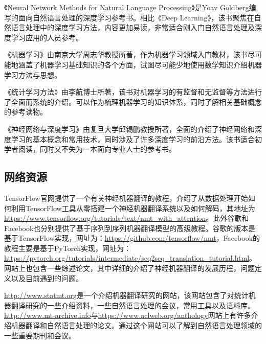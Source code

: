 \parinterval 《Neural Network Methods for Natural Language Processing》\cite{goldberg2017neural}是Yoav Goldberg编写的面向自然语言处理的深度学习参考书。相比《Deep Learning》，该书聚焦在自然语言处理中的深度学习方法，内容更加易读，非常适合刚入门自然语言处理及深度学习应用的人员参考。

\parinterval 《机器学习》\cite{周志华2016机器学习}由南京大学周志华教授所著，作为机器学习领域入门教材，该书尽可能地涵盖了机器学习基础知识的各个方面，试图尽可能少地使用数学知识介绍机器学习方法与思想。

\parinterval 《统计学习方法》\cite{李航2012统计学习方法}由李航博士所著，该书对机器学习的有监督和无监督等方法进行了全面而系统的介绍。可以作为梳理机器学习的知识体系，同时了解相关基础概念的参考读物。

\parinterval 《神经网络与深度学习》\cite{邱锡鹏2020神经网络与深度学习}由复旦大学邱锡鹏教授所著，全面的介绍了神经网络和深度学习的基本概念和常用技术，同时涉及了许多深度学习的前沿方法。该书适合初学者阅读，同时又不失为一本面向专业人士的参考书。

\subsection{网络资源}

\parinterval  TensorFlow官网提供了一个有关神经机器翻译的教程，介绍了从数据处理开始如何利用TensorFlow工具从零搭建一个神经机器翻译系统以及如何解码，其地址为\url{https://www.tensorflow.org/tutorials/text/nmt\_with\_attention}。此外谷歌和Facebook也分别提供了基于序列到序列机器翻译模型的高级教程。谷歌的版本是基于TensorFlow实现，网址为：\url{https://github.com/tensorflow/nmt}，Facebook的教程主要是基于PyTorch实现，网址为：\url{https://pytorch.org/tutorials/intermediate/seq2seq\_translation\_tutorial.html}。网站上也包含一些综述论文，其中详细的介绍了神经机器翻译的发展历程，问题定义以及目前遇到的问题。

\parinterval  \url{http://www.statmt.org}是一个介绍机器翻译研究的网站，该网站包含了对统计机器翻译研究的一些介绍资料，一些自然语言处理的会议，常用工具以及语料库。\url{http://www.mt-archive.info}与\url{https://www.aclweb.org/anthology}网站上有许多介绍机器翻译和自然语言处理的论文。通过这个网站可以了解到自然语言处理领域的一些重要期刊和会议。

